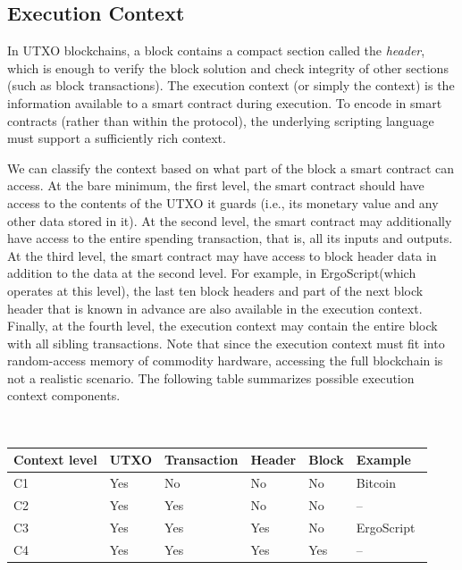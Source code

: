 \documentclass[11pt]{article}
\newcommand{\langname}{ErgoScript\xspace}
\begin{document}
\subsection{Execution Context}
\label{context}

In UTXO blockchains, a block contains a compact section called the {\em header}, which is
enough to verify the block solution and check integrity of other sections (such as block transactions). 
The execution context (or simply the context) is the information available to a smart contract during execution. 
To encode \algname in smart contracts (rather than within the protocol), the underlying scripting language must support  a sufficiently rich context.

We can classify the context based on what part of the block a smart contract can access. At the bare minimum, the first level, the smart contract should have access to the contents of the UTXO it guards (i.e., its monetary value and any other data stored in it). At the second level, the smart contract may additionally have access to the entire spending transaction, that is, all its inputs and outputs. At the third level, the smart contract may have access to block header data in addition to the data at the second level. For example, in \langname (which operates at this level), the last ten block headers and part of the next block header that is known in advance are also available in the execution context. Finally, at the fourth level, the execution context may contain the entire block with all sibling transactions. Note that since the execution context must fit into random-access memory of commodity hardware, accessing the full blockchain is not a realistic scenario. The following
 table summarizes possible execution context components.

~\\
\begin{tabular}{|l|l|l|l|l|l|}\hline
	Context level & UTXO & Transaction & Header      & Block & Example \\ \hline
	 C1     & Yes  & No          & No  		   & No    & Bitcoin~\cite{Nak08} \\
	 C2     & Yes & Yes         & No 		   & No    & -- \\
	 C3     & Yes & Yes         & Yes 		   & No    & \langname ~\cite{ergo}   \\
	 C4     & Yes & Yes         & Yes 		   & Yes   & --    \\\hline
\end{tabular}
\end{document}
